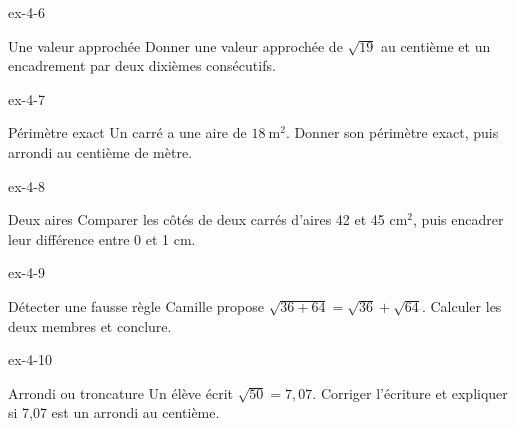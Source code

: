\begin{blocLivre}{ex-4-6}\begin{exercice}[2]{Une valeur approchée}
Donner une valeur approchée de $\sqrt{19}$ au centième et un encadrement par deux dixièmes consécutifs.
\end{exercice}\end{blocLivre}
\begin{blocLivre}{ex-4-7}\begin{exercice}[2]{Périmètre exact}
Un carré a une aire de $18\ \mathrm{m}^2$. Donner son périmètre exact, puis arrondi au centième de mètre.
\label{fig-ex-4-7}
\end{exercice}\end{blocLivre}
\begin{blocLivre}{ex-4-8}\begin{exercice}[2]{Deux aires}
Comparer les côtés de deux carrés d’aires 42 et 45 cm$^2$, puis encadrer leur différence entre 0 et 1 cm.
\end{exercice}\end{blocLivre}
\begin{blocLivre}{ex-4-9}\begin{exercice}[2]{Détecter une fausse règle}
Camille propose $\sqrt{36+64}=\sqrt{36}+\sqrt{64}$. Calculer les deux membres et conclure.
\end{exercice}\end{blocLivre}
\begin{blocLivre}{ex-4-10}\begin{exercice}[2]{Arrondi ou troncature}
Un élève écrit $\sqrt{50}=7{,}07$. Corriger l’écriture et expliquer si 7,07 est un arrondi au centième.
\end{exercice}\end{blocLivre}

